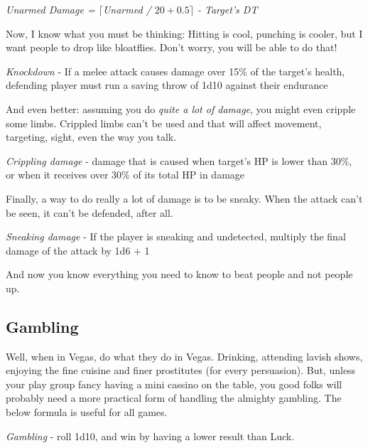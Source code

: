 \documentclass[11pt]{article} %
\begin{document}
\begin{center}
        \textit{Unarmed Damage = $\lceil$Unarmed / $20 + 0.5\rceil$ - Target's DT}
\end{center}

Now, I know what you must be thinking: Hitting is cool, punching is cooler, but I want people to drop like bloatflies. Don't worry, you will be able to do that!

\begin{center}
	\textit{Knockdown} - If a melee attack causes damage over 15\% of the target's health, defending player must run a saving throw of 1d10 against their endurance
\end{center}

And even better: assuming you do \textit{quite a lot of damage}, you might even cripple some limbs. Crippled limbs can't be used and that will affect movement, targeting, sight, even the way you talk.

\begin{center}
        \textit{Crippling damage} - damage that is caused when target's HP is lower than 30\%, or when it receives over 30\% of its total HP in damage
\end{center}

Finally, a way to do really a lot of damage is to be sneaky. When the attack can't be seen, it can't be defended, after all.

\begin{center}
        \textit{Sneaking damage} - If the player is sneaking and undetected, multiply the final damage of the attack by 1d6 + 1
\end{center}        

And now you know everything you need to know to beat people and not people up.

\subsection{Gambling}

Well, when in Vegas, do what they do in Vegas. Drinking, attending lavish shows, enjoying the fine cuisine and finer prostitutes (for every persuasion). But, unless your play group fancy having a mini cassino on the table, you good folks will probably need a more practical form of handling the almighty gambling. The below formula is useful for all games.

\begin{center}
	\textit{Gambling} - roll 1d10, and win by having a lower result than Luck.
\end{center}
\end{document}
